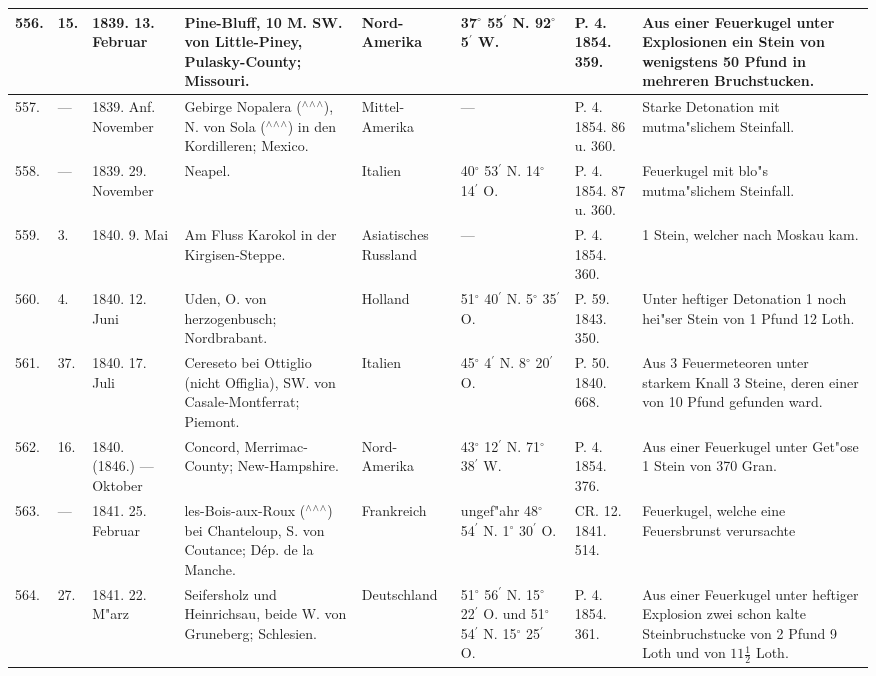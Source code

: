 \documentclass[a4paper, 8pt, oneside, polutonikogreek, german]{article}
\begin{document}
\begin{center}
\begin{longtable}{| p{4mm} | p{2mm} | p{15mm} | p{25mm} | p{16mm} | p{12mm} | p{13mm} | p{20mm} |}
        556. & 15. & 1839. 13. Februar & Pine-Bluff, 10 M. SW. von Little-Piney, Pulasky-County; Missouri. & Nord-Amerika & 37$^\circ$ 55$^\prime$ N. 92$^\circ$ 5$^\prime$ W. & P. 4. 1854. 359. & Aus einer Feuerkugel unter Explosionen ein Stein von wenigstens 50 Pfund in mehreren Bruchstucken. \\ \hline
        557. & --- & 1839. Anf. November & Gebirge Nopalera ($^\wedge$$^\wedge$$^\wedge$), N. von Sola ($^\wedge$$^\wedge$$^\wedge$) in den Kordilleren; Mexico. & Mittel-Amerika & --- & P. 4. 1854. 86 u. 360. & Starke Detonation mit mutma"slichem Steinfall. \\ \hline
        558. & --- & 1839. 29. November & Neapel. & Italien & 40$^\circ$ 53$^\prime$ N. 14$^\circ$ 14$^\prime$ O. & P. 4. 1854. 87 u. 360. & Feuerkugel mit blo"s mutma"slichem Steinfall. \\ \hline
        559. & 3. & 1840. 9. Mai & Am Fluss Karokol in der Kirgisen-Steppe. & Asiatisches Russland & --- & P. 4. 1854. 360. & 1 Stein, welcher nach Moskau kam. \\ \hline
        560. & 4. & 1840. 12. Juni & Uden, O. von herzogenbusch; Nordbrabant. & Holland & 51$^\circ$ 40$^\prime$ N. 5$^\circ$ 35$^\prime$ O. & P. 59. 1843. 350. & Unter heftiger Detonation 1 noch hei"ser Stein von 1 Pfund 12 Loth. \\ \hline
        561. & 37. & 1840. 17. Juli & Cereseto bei Ottiglio (nicht Offiglia), SW. von Casale-Montferrat; Piemont. & Italien & 45$^\circ$ 4$^\prime$ N. 8$^\circ$ 20$^\prime$ O. & P. 50. 1840. 668. & Aus 3 Feuermeteoren unter starkem Knall 3 Steine, deren einer von 10 Pfund gefunden ward. \\ \hline
        562. & 16. & 1840. (1846.) --- Oktober & Concord, Merrimac-County; New-Hampshire. & Nord-Amerika & 43$^\circ$ 12$^\prime$ N. 71$^\circ$ 38$^\prime$ W. & P. 4. 1854. 376. & Aus einer Feuerkugel unter Get"ose 1 Stein von 370 Gran. \\ \hline
        563. & --- & 1841. 25. Februar & les-Bois-aux-Roux ($^\wedge$$^\wedge$$^\wedge$) bei Chanteloup, S. von Coutance; Dép. de la Manche. & Frankreich & ungef"ahr 48$^\circ$ 54$^\prime$ N. 1$^\circ$ 30$^\prime$ O. & CR. 12. 1841. 514. & Feuerkugel, welche eine Feuersbrunst verursachte \\ \hline
        564. & 27. & 1841. 22. M"arz & Seifersholz und Heinrichsau, beide W. von Gruneberg; Schlesien. & Deutschland & 51$^\circ$ 56$^\prime$ N. 15$^\circ$ 22$^\prime$ O. und 51$^\circ$ 54$^\prime$ N. 15$^\circ$ 25$^\prime$ O. & P. 4. 1854. 361. & Aus einer Feuerkugel unter heftiger Explosion zwei schon kalte Steinbruchstucke von 2 Pfund 9 Loth und von $11\frac{1}{2}$ Loth. \\ \hline

\end{longtable}
\end{center}
\end{document}
